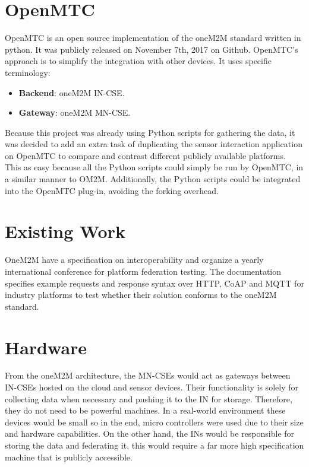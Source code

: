\section{OpenMTC}

OpenMTC\cite{OpenMTC2017OpenMTC} is an open source implementation of the oneM2M standard written in python. It was publicly released on November 7th, 2017 on Github. OpenMTC's approach is to simplify the integration with other devices. It uses specific terminology:

\begin{itemize}
  \item \textbf{Backend}: oneM2M IN-CSE.
  \item \textbf{Gateway}: oneM2M MN-CSE.
\end{itemize}

Because this project was already using Python scripts for gathering the data, it was decided to add an extra task of duplicating the sensor interaction application on OpenMTC to compare  and contrast different publicly available platforms. This as easy because all the Python scripts could simply be run by OpenMTC, in a similar manner to OM2M. Additionally, the Python scripts could be integrated into the OpenMTC plug-in, avoiding the forking overhead.

\section{Existing Work}

OneM2M have a specification on interoperability \cite{oneM2M2016OneM2Minter} and organize a yearly international conference for platform federation testing. The documentation specifies example requests and response syntax over HTTP, CoAP and MQTT for industry platforms to test whether their solution conforms to the oneM2M standard.

\section{Hardware}

From the oneM2M architecture, the MN-CSEs would act as gateways between IN-CSEs hosted on the cloud and sensor devices. Their functionality is solely for collecting data when necessary and pushing it to the IN for storage. Therefore, they do not need to be powerful machines. In a real-world environment these devices would be small so in the end, micro controllers were used due to their size and hardware capabilities. On the other hand, the INs would be responsible for storing the data and federating it, this would require a far more high specification machine that is publicly accessible. 


